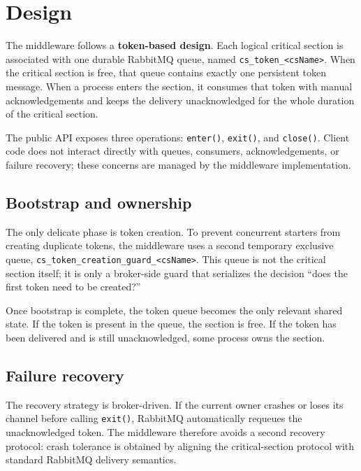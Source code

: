 \clearpage
\section{Design}

The middleware follows a \textbf{token-based design}. Each logical critical
section is associated with one durable RabbitMQ queue, named
\texttt{cs\_token\_<csName>}. When the critical section is free, that queue
contains exactly one persistent token message. When a process enters the
section, it consumes that token with manual acknowledgements and keeps the
delivery unacknowledged for the whole duration of the critical section.

The public API exposes three operations: \texttt{enter()}, \texttt{exit()}, and
\texttt{close()}. Client code does not interact directly with queues,
consumers, acknowledgements, or failure recovery; these concerns are managed by
the middleware implementation.

\subsection{Bootstrap and ownership}

The only delicate phase is token creation. To prevent concurrent starters from
creating duplicate tokens, the middleware uses a second temporary exclusive
queue, \texttt{cs\_token\_creation\_guard\_<csName>}. This queue is not the
critical section itself; it is only a broker-side guard that serializes the
decision ``does the first token need to be created?''

Once bootstrap is complete, the token queue becomes the only relevant shared
state. If the token is present in the queue, the section is free. If the token
has been delivered and is still unacknowledged, some process owns the section.

\subsection{Failure recovery}

The recovery strategy is broker-driven. If the current owner crashes or loses
its channel before calling \texttt{exit()}, RabbitMQ automatically requeues the
unacknowledged token. The middleware therefore avoids a second recovery
protocol: crash tolerance is obtained by aligning the critical-section protocol
with standard RabbitMQ delivery semantics.
